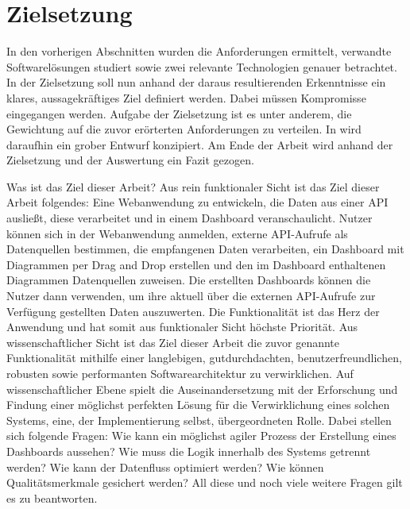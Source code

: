 \section{Zielsetzung}
\label{sec:zielsetzung}
In den vorherigen Abschnitten wurden die Anforderungen ermittelt, verwandte Softwarelösungen
studiert sowie zwei relevante Technologien genauer betrachtet. In der Zielsetzung soll nun
anhand der daraus resultierenden Erkenntnisse ein klares, aussagekräftiges Ziel definiert werden.
Dabei müssen Kompromisse eingegangen werden. Aufgabe der Zielsetzung ist es unter anderem,
die Gewichtung auf die zuvor erörterten Anforderungen zu verteilen. In 
wird daraufhin ein grober Entwurf konzipiert. Am Ende der Arbeit wird anhand der Zielsetzung
und der Auswertung ein Fazit gezogen.

Was ist das Ziel dieser Arbeit? Aus rein funktionaler Sicht ist das Ziel dieser Arbeit
folgendes: Eine Webanwendung zu entwickeln, die Daten aus einer API ausließt,
diese verarbeitet und in einem Dashboard veranschaulicht. Nutzer können sich
in der Webanwendung anmelden, externe API-Aufrufe als Datenquellen bestimmen,
die empfangenen Daten verarbeiten, ein Dashboard mit Diagrammen per Drag and Drop erstellen
und den im Dashboard enthaltenen Diagrammen Datenquellen zuweisen. Die erstellten
Dashboards können die Nutzer dann verwenden, um ihre aktuell über die externen 
API-Aufrufe zur Verfügung gestellten Daten auszuwerten. Die Funktionalität
ist das Herz der Anwendung und hat somit aus funktionaler Sicht höchste Priorität.
Aus wissenschaftlicher Sicht ist das Ziel dieser Arbeit die zuvor genannte
Funktionalität mithilfe einer langlebigen, gutdurchdachten, benutzerfreundlichen,
robusten sowie performanten Softwarearchitektur zu verwirklichen. Auf wissenschaftlicher
Ebene spielt die Auseinandersetzung mit der Erforschung und Findung einer möglichst perfekten
Lösung für die Verwirklichung eines solchen Systems, eine, der Implementierung selbst,
übergeordneten Rolle. Dabei stellen sich folgende Fragen: Wie kann ein möglichst agiler
Prozess der Erstellung eines Dashboards aussehen? Wie muss die Logik innerhalb des Systems
getrennt werden? Wie kann der Datenfluss optimiert werden? Wie können Qualitätsmerkmale
gesichert werden? All diese und noch viele weitere Fragen gilt es zu beantworten.

